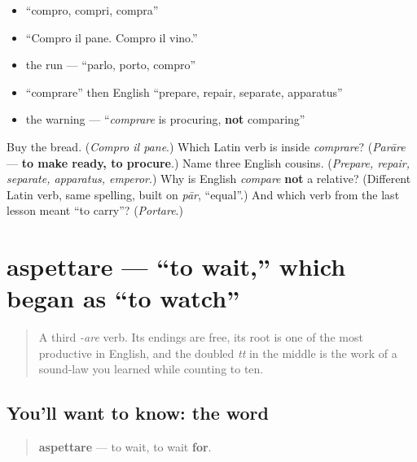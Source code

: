 \begin{itemize}
\raggedright
  \item \textquotedblleft{}compro, compri, compra\textquotedblright{}
  \item \textquotedblleft{}Compro il pane. Compro il vino.\textquotedblright{}
  \item the run — \textquotedblleft{}parlo, porto, compro\textquotedblright{}
  \item \textquotedblleft{}comprare\textquotedblright{} then English \textquotedblleft{}prepare, repair, separate, apparatus\textquotedblright{}
  \item the warning — \textquotedblleft{}\emph{comprare} is procuring, \textbf{not} comparing\textquotedblright{}
\end{itemize}

\begin{tcolorbox}[breakable,colback=teal!4,colframe=teal!35!black,title={Before you move on}]
Buy the bread. (\emph{Compro il pane}.) Which Latin verb is inside \emph{comprare}? (\emph{Parāre} — \textbf{to make ready, to procure}.) Name three English cousins. (\emph{Prepare, repair, separate, apparatus, emperor}.) Why is English \emph{compare} \textbf{not} a relative? (Different Latin verb, same spelling, built on \emph{pār}, \textquotedblleft{}equal\textquotedblright{}.) And which verb from the last lesson meant \textquotedblleft{}to carry\textquotedblright{}? (\emph{Portare}.)
\end{tcolorbox}
\section[aspettare]{aspettare — \textquotedblleft{}to wait,\textquotedblright{} which began as \textquotedblleft{}to watch\textquotedblright{}}

\label{lesson:IT-C20-aspettare}



\begin{quote}
A third \emph{-are} verb. Its endings are free, its root is one of the most productive in English, and the doubled \emph{tt} in the middle is the work of a sound-law you learned while counting to ten.
\end{quote}

\subsection*{You'll want to know: the word}
\begin{quote}
\textbf{aspettare} — to wait, to wait \textbf{for}.
\end{quote}

